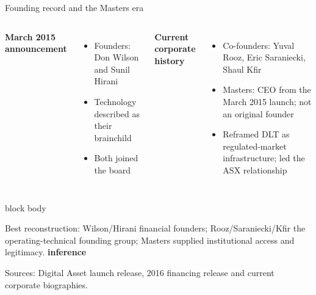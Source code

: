 \documentclass[aspectratio=169,12pt]{beamer}
\newcommand{\rust}[1]{\textcolor{Rust}{\textbf{#1}}}
\newcommand{\blue}[1]{\textcolor{Ocean}{\textbf{#1}}}
\newcommand{\source}[1]{\vfill\par\fontsize{5.4}{6.5}\selectfont\color{Quiet}Sources: #1}
\newcommand{\tightitems}{\setlength{\itemsep}{0.42em}\setlength{\parskip}{0pt}}
\newcommand{\tinf}{\textcolor{Ocean}{\bfseries inference}}
\newenvironment{statement}{%
  \begin{beamercolorbox}[sep=.18cm,rounded=false,wd=\linewidth]{block body}%
  \fontsize{13}{15.5}\selectfont\bfseries
}{\end{beamercolorbox}}
\begin{document}
\begin{frame}{Founding record and the Masters era}
  \fontsize{10.2}{12.2}\selectfont
  \begin{columns}[T,onlytextwidth]
      \rust{March 2015 announcement}
      \begin{itemize}\tightitems
        \item Founders: Don Wilson and Sunil Hirani
        \item Technology described as their brainchild
        \item Both joined the board
      \end{itemize}
      \blue{Current corporate history}
      \begin{itemize}\tightitems
        \item Co-founders: Yuval Rooz, Eric Saraniecki, Shaul Kfir
        \item Masters: CEO from the March 2015 launch; not an original founder
        \item Reframed DLT as regulated-market infrastructure; led the ASX relationship
      \end{itemize}
  \end{columns}
  \vspace{0.08cm}
  \begin{statement}
    Best reconstruction: Wilson/Hirani financial founders; Rooz/Saraniecki/Kfir the operating-technical founding group; Masters supplied institutional access and legitimacy. \hfill\tinf
  \end{statement}
  \source{Digital Asset launch release, 2016 financing release and current corporate biographies.}
\end{frame}
\end{document}
